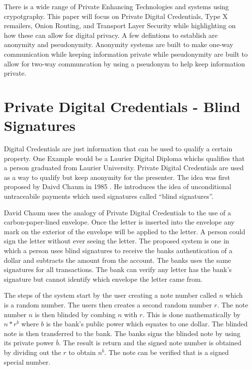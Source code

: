 \documentclass[12pt]{article}
\begin{document}
There is a wide range of Private Enhancing Technologies and systems using crypotgraphy. This paper will focus on Private Digital Credentials, Type X remailers, Onion Routing, and Transport Layer Security while highlighting on how these can allow for digital privacy. A few defintions to establish are anonymity and pseudonymity. Anonymity systems are built to make one-way communication while keeping information private while pseudonymity are built to allow for two-way communcation by using a pseudonym to help keep information private. \cite{GoldbergTwo}

\section{Private Digital Credentials - Blind Signatures}\label{sec:PDC}
Digital Credentials are just information that can be used to qualify a certain property. One Example would be a Laurier Digital Diploma whichs qualifies that a person graduated from Laurier University.  Private Digital Credentials are used as a way to qualify but keep anonymity for the presenter. The idea was first proposed by Daivd Chaum in 1985 \cite{Chaum}. He introduces the idea of unconditional untraceabile payments which used signatures called ``blind signatures''. 

David Chaum uses the analogy of Private Digital Credentials to the use of a carbon-paper-lined envelope. Once the letter is inserted into the envelope any mark on the exterior of the envelope will be applied to the letter. A person could sign the letter without ever seeing the letter. The proposed system is one in which a person uses blind signatures to receive the banks authentication of a dollar and subtracts the amount from the account. The banks uses the same signatures for all transactions. The bank can verify any letter has the bank's signature but cannot identify which envelope the letter came from.

The steps of the system start by the user creating a note number called $n$ which is a random number. The users then creates a second random number  $r$. The note number $n$ is then blinded by combing $n$ with $r$. This is done mathematically by $n * r^b$ where $b$ is the bank's public power which equates to one dollar. The blinded note is then transferred to the bank. The banks signs the blinded note by using its private power $\overline{b}$. The result is return and the signed note number is obtained by dividing out the $r$ to obtain $n^{\overline{b}}$. The note can be verified that is a signed special number.
\end{document}
